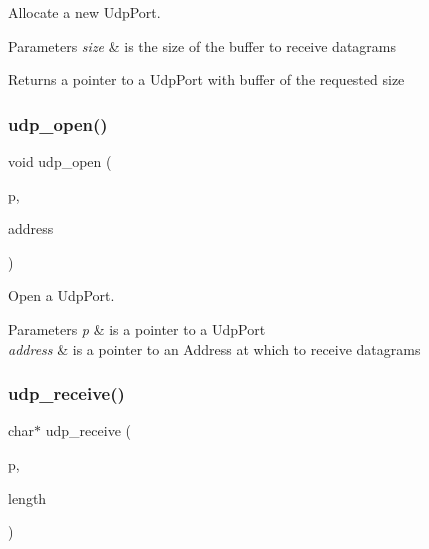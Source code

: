 Allocate a new Udp\+Port. 


\begin{DoxyParams}{Parameters}
{\em size} & is the size of the buffer to receive datagrams \\
\hline
\end{DoxyParams}
\begin{DoxyReturn}{Returns}
a pointer to a Udp\+Port with buffer of the requested size 
\end{DoxyReturn}
\mbox{\label{group__udp_ga2bcfb527d627ba3162937e2096c4eccf}} 
\subsubsection{\texorpdfstring{udp\+\_\+open()}{udp\_open()}}
{\footnotesize\ttfamily void udp\+\_\+open (\begin{DoxyParamCaption}\item[{\hyperlink{group__udp_ga0c4c532cfe05c936ac56874867ba49e4}{Udp\+Port} $\ast$}]{p,  }\item[{\hyperlink{group__address_ga80f2dcdb3778441e85ac8c9dbb6f324a}{Address} $\ast$}]{address }\end{DoxyParamCaption})}



Open a Udp\+Port. 


\begin{DoxyParams}{Parameters}
{\em p} & is a pointer to a Udp\+Port \\
\hline
{\em address} & is a pointer to an Address at which to receive datagrams \\
\hline
\end{DoxyParams}
\mbox{\label{group__udp_gaf0333276e97bcc889b582368165bd1a8}} 
\subsubsection{\texorpdfstring{udp\+\_\+receive()}{udp\_receive()}}
{\footnotesize\ttfamily char$\ast$ udp\+\_\+receive (\begin{DoxyParamCaption}\item[{\hyperlink{group__udp_ga0c4c532cfe05c936ac56874867ba49e4}{Udp\+Port} $\ast$}]{p,  }\item[{int $\ast$}]{length }\end{DoxyParamCaption})}



